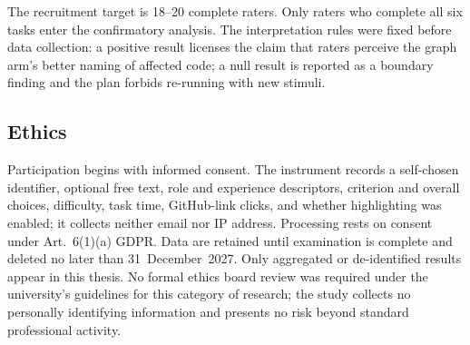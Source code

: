 The recruitment target is 18--20 complete raters. Only raters who complete
all six tasks enter the confirmatory analysis. The interpretation rules were
fixed before data collection: a positive result
licenses the claim that raters perceive the graph arm's better naming of
affected code; a
null result is reported as a boundary finding and the plan forbids re-running
with new stimuli.

\subsection{Ethics}

Participation begins with informed consent. The instrument records a
self-chosen identifier, optional free text, role and experience descriptors,
criterion and overall choices, difficulty, task time, GitHub-link clicks, and
whether highlighting was enabled; it collects neither email nor IP address.
Processing rests on consent under Art.~6(1)(a) GDPR. Data are retained until
examination is complete and deleted no later than 31~December~2027. Only
aggregated or de-identified results appear in this thesis. No formal ethics
board review was required under the university's guidelines for this category
of research; the study collects no personally identifying information and
presents no risk beyond standard professional activity.
